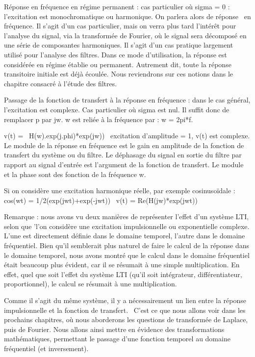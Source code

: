 \documentclass[]{article}
\begin{document}
Réponse en fréquence en régime permanent : cas particulier où sigma = 0
: l'excitation est monochromatique ou harmonique. On parlera alors de
réponse~ en fréquence. Il s'agit d'un cas particulier, mais on verra
plus tard l'intérêt pour l'analyse du signal, via la transformée de
Fourier, où le signal sera décomposé en une série de composantes
harmoniques. Il s'agit d'un cas pratique largement utilisé pour
l'analyse des filtres. Dans ce mode d'utilisation, la réponse est
considérée en régime établie ou permanent. Autrement dit, toute la
réponse transitoire initiale est déjà écoulée. Nous reviendrons sur ces
notions dans le chapitre consacré à l'étude des filtres.

Passage de la fonction de transfert à la réponse en fréquence : dans le
cas général, l'excitation est complexe. Cas particulier où sigma est
nul. Il suffit donc de remplacer p par jw. w est reliée à la fréquence
par : w = 2pi*f.

v(t) =~ \textbar{}H(w)\textbar{}.exp(j.phi)*exp(jw))~ excitation
d'amplitude = 1, v(t) est complexe. Le module de la réponse en fréquence
est le gain en amplitude de la fonction de transfert du système ou du
filtre. Le déphasage du signal en sortie du filtre par rapport au signal
d'entrée est l'argument de la fonction de transfert. Le module et la
phase sont des fonction de la fréquence w.

Si on considère une excitation harmonique réelle, par exemple
cosinusoïdale : cos(wt) = 1/2(exp(jwt)+exp(-jwt))~ v(t) =
Re(H(jw)*exp(jwt))

Remarque : nous avons vu deux manières de représenter l'effet d'un
système LTI, selon que 'l'on considère une excitation impulsionnelle ou
exponentielle complexe. L'une est directement définie dans le domaine
temporel, l'autre dans le domaine fréquentiel. Bien qu'il semblerait
plus naturel de faire le calcul de la réponse dans le domaine temporel,
nous avons montré que le calcul dans le domaine fréquentiel était
beaucoup plus évident, car il se résumait à une simple multiplication.
En effet, quel que soit l'effet du système LTI (qu'il soit intégrateur,
différentiateur, proportionnel), le calcul se résumait à une
multiplication.

Comme il s'agit du même système, il y a nécessairement un lien entre la
réponse impulsionnelle et la fonction de transfert.~ C'est ce que nous
allons voir dans les prochains chapitres, où nous aborderons les
questions de transformée de Laplace, puis de Fourier. Nous allons ainsi
mettre en évidence des transformations mathématiques, permettant le
passage d'une fonction temporel au domaine fréquentiel (et inversement).
\end{document}
